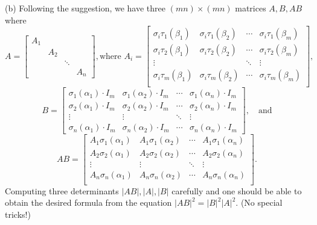\documentclass[../Marcus.tex]{subfiles}
\begin{document}
(b) Following the suggestion, we have three $(mn)\times(mn)$ matrices $A,B,AB$ where
$$
A=
\begin{bmatrix}
    A_1 &         &             &               \\
           & A_2 &             &               \\
           &         & \ddots &               \\
           &         &             & A_{n}
\end{bmatrix}, \text{where }
A_i=
\begin{bmatrix}
    \sigma_i\tau_1(\beta_1) & \sigma_i\tau_1(\beta_2) & \cdots & \sigma_i\tau_1(\beta_m)  \\
    \sigma_i\tau_2(\beta_1) & \sigma_i\tau_2(\beta_2) & \cdots & \sigma_i\tau_2(\beta_m) \\
    \vdots &     & \ddots & \vdots       \\
    \sigma_i\tau_m(\beta_1) & \sigma_i\tau_m(\beta_2) & \cdots & \sigma_i\tau_m(\beta_m) \\
\end{bmatrix},
$$
$$
B=\begin{bmatrix}
    \sigma_1(\alpha_1)\cdot I_m & \sigma_1(\alpha_2)\cdot I_m & \cdots & \sigma_1(\alpha_n)\cdot I_m  \\
    \sigma_2(\alpha_1)\cdot I_m & \sigma_2(\alpha_2)\cdot I_m & \cdots & \sigma_2(\alpha_n)\cdot I_m  \\
    \vdots & \vdots & \ddots & \vdots \\
    \sigma_n(\alpha_1)\cdot I_m & \sigma_n(\alpha_2)\cdot I_m & \cdots & \sigma_n(\alpha_n)\cdot I_m
\end{bmatrix}, \quad \text{and}
$$
$$
AB=
\begin{bmatrix}
    A_1\sigma_1(\alpha_1) & A_1\sigma_1(\alpha_2) & \cdots & A_1\sigma_1(\alpha_n)  \\
    A_2\sigma_2(\alpha_1) & A_2\sigma_2(\alpha_2) & \cdots & A_2\sigma_2(\alpha_n)  \\
    \vdots & \vdots & \ddots & \vdots  \\
    A_n\sigma_n(\alpha_1) & A_n\sigma_n(\alpha_2) & \cdots & A_n\sigma_n(\alpha_n)  \\
\end{bmatrix}.
$$
Computing three determinants $|AB|,|A|,|B|$ carefully and one should be able to obtain the desired formula from the equation $|AB|^2=|B|^2|A|^2$. (No special tricks!)
\end{document}
